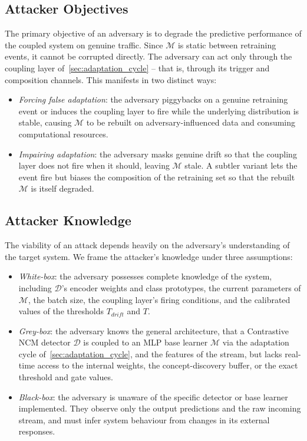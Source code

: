 \subsection{Attacker Objectives}
The primary objective of an adversary is to degrade the predictive performance of the coupled system on genuine traffic. Since $\mathcal{M}$ is static between retraining events, it cannot be corrupted directly. The adversary can act only through the coupling layer of~\cref{sec:adaptation_cycle} -- that is, through its trigger and composition channels. This manifests in two distinct ways:
\begin{itemize}
    \item \textit{Forcing false adaptation}: the adversary piggybacks on a genuine retraining event or induces the coupling layer to fire while the underlying distribution is stable, causing $\mathcal{M}$ to be rebuilt on adversary-influenced data and consuming computational resources.

    \item \textit{Impairing adaptation}: the adversary masks genuine drift so that the coupling layer does not fire when it should, leaving $\mathcal{M}$ stale. A subtler variant lets the event fire but biases the composition of the retraining set so that the rebuilt $\mathcal{M}$ is itself degraded.
\end{itemize}

\subsection{Attacker Knowledge}
The viability of an attack depends heavily on the adversary's understanding of the target system. We frame the attacker's knowledge under three assumptions:
\begin{itemize}
    \item \textit{White-box}: the adversary possesses complete knowledge of the system, including $\mathcal{D}$'s encoder weights and class prototypes, the current parameters of $\mathcal{M}$, the batch size, the coupling layer's firing conditions, and the calibrated values of the thresholds $T_{drift}$ and $T$.

    \item \textit{Grey-box}: the adversary knows the general architecture, that a Contrastive NCM detector $\mathcal{D}$ is coupled to an MLP base learner $\mathcal{M}$ via the adaptation cycle of~\cref{sec:adaptation_cycle}, and the features of the stream, but lacks real-time access to the internal weights, the concept-discovery buffer, or the exact threshold and gate values.

    \item \textit{Black-box}: the adversary is unaware of the specific detector or base learner implemented. They observe only the output predictions and the raw incoming stream, and must infer system behaviour from changes in its external responses.
\end{itemize}

